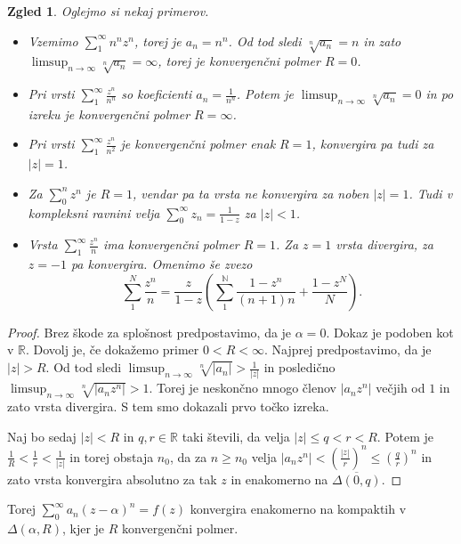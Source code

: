 \documentclass[10pt, a4paper]{article}
\newtheorem{zgled}{Zgled}[section]
\newenvironment{noticeC}{%
  \tcolorbox[%
  notitle,
  empty,
  enhanced,  %
  breakable,
  coltext=black, 
  fontupper=\rmfamily,
  parbox=false,
  noparskip,
  sharp corners,
  boxrule=-1pt,  %
  frame hidden,
  left=7pt,  %
  right=7pt,
  top=5pt,
  bottom=5pt,
  before skip=2.5ex plus 2pt,
  after skip=2.5ex plus 2pt,
  overlay unbroken and last={%
  },
  ]}
{\endtcolorbox}
\newenvironment{dokaz}%
  {\begin{noticeC}\begin{proof}}%
  {\end{proof}\end{noticeC}}
\newcommand{\N}{\mathbb {N}}
\newcommand{\R}{\mathbb {R}}
\begin{document}
\begin{zgled}
  Oglejmo si nekaj primerov.
  \begin{itemize}
    \item Vzemimo $\sum_1 ^\infty n^n z^n$, torej je $a_n = n^n$.
    Od tod sledi $\sqrt[n]{a_n} = n$ in zato $\limsup_{n \to \infty} \sqrt[n]{a_n} = \infty$,
    torej je konvergenčni polmer $R = 0$.
    \item Pri vrsti $\sum_{1} ^\infty \frac{z^n}{n^n}$ so koeficienti $a_n = \frac{1}{n^n}$.
    Potem je $\limsup_{n \to \infty} \sqrt[n]{a_n} = 0$ in po izreku je konvergenčni polmer $R = \infty$.
    \item Pri vrsti $\sum_1 ^\infty \frac{z^n}{n^2}$ je konvergenčni polmer enak $R = 1$,
    konvergira pa tudi za $|z| = 1$. 
    \item Za $\sum_0 ^n z^n$ je $R = 1$, vendar pa ta vrsta ne konvergira za noben $|z| = 1$.
    Tudi v kompleksni ravnini velja $\sum_0 ^\infty z_n = \frac{1}{1 - z}$ za $|z| < 1$.
    \item Vrsta $\sum_1 ^\infty \frac{z^n}{n}$ ima konvergenčni polmer $R = 1$.
    Za $z = 1$ vrsta divergira, za $z = - 1$ pa konvergira. Omenimo še zvezo 
    $$\sum_{1} ^N \frac{z^n}{n} = \frac{z}{1 - z} \left(\sum_{1} ^\N \frac{1 - z^n}{(n+ 1)n} + \frac{1 - z^N}{N}\right).$$
  \end{itemize}
\end{zgled}

\begin{dokaz}
  Brez škode za splošnost predpostavimo, da je $\alpha = 0$.
  Dokaz je podoben kot v $\R$. Dovolj je, če dokažemo primer 
  $0 < R < \infty$. Najprej predpostavimo, da je $|z| > R$.
  Od tod sledi $\limsup_{n \to \infty} \sqrt[n]{|a_n|} > \frac{1}{|z|}$
  in posledično $\limsup_{n \to \infty} \sqrt[n]{|a_n z^n|} > 1$.
  Torej je neskončno mnogo členov $|a_n z^n|$ večjih od $1$ in zato vrsta 
  divergira. S tem smo dokazali prvo točko izreka.
  
  Naj bo sedaj $|z| < R$ in $q, r \in \R$ taki števili,
  da velja $|z| \leq q < r < R$.
  Potem je $\frac{1}{R} < \frac{1}{r} < \frac{1}{|z|}$
  in torej obstaja $n_0$, da za $n \geq n_0$ 
  velja $|a_n z^n| < \left(\frac{|z|}{r}\right)^n \leq \left(\frac{q}{r}\right)^n$
  in zato vrsta konvergira absolutno za tak $z$ in enakomerno na $\overline{\Delta (0, q)}$.
\end{dokaz}

Torej $\sum_0 ^\infty a_n (z - \alpha)^n = f(z)$ konvergira enakomerno na kompaktih v $\Delta (\alpha, R)$,
kjer je $R$ konvergenčni polmer.
\end{document}
